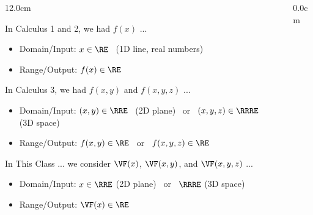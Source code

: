 \begin{frame}
\begin{columns}
\begin{column}{12.0cm}
\vspace{0.3cm}

In Calculus 1 and 2, we had $f(x)$ ...

\begin{itemize}
	\item Domain/Input: \quad $x \in \RE$ \, (1D line, real numbers)
	\item Range/Output: \quad $f(x) \in \RE$
\end{itemize}

\vspace{0.1cm}

In Calculus 3, we had $f(x,y)$ and $f(x,y,z)$ ... 

\begin{itemize}
	\item Domain/Input: \quad $(x,y) \in \RRE$ \, (2D plane) \, or \, $(x,y,z) \in \RRRE$ \, (3D space)
	\item Range/Output: \quad $f(x,y) \in \RE$ \, or \, $f(x,y,z) \in \RE$
\end{itemize}

\vspace{0.1cm}

In This Class ... we consider $\VF(x)$, $\VF(x,y)$, and $\VF(x,y,z)$ ... 

\begin{itemize}
	\item Domain/Input: \quad $x \in \RRE$ (2D plane) \, or \, $\RRRE$ (3D space)
	\item Range/Output: \quad $\VF(x) \in \RE$
\end{itemize}

\end{column}
\begin{column}{0.0cm}\end{column}
\end{columns}
\end{frame}

